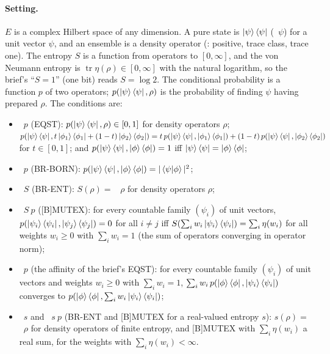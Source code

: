 \documentclass[11pt]{article}
\begin{document}
\paragraph{Setting.} $E$ is a complex Hilbert space of any dimension. A pure state is
$\ket\psi\bra\psi$ (~$\psi$) for a unit vector $\psi$, and an ensemble is a density
operator (: positive, trace class, trace one). The entropy
$S$ is a function from operators to $[0, \infty]$, and the von Neumann entropy
 is $\operatorname{tr}\eta(\rho) \in [0, \infty]$ with the natural
logarithm, so the brief's ``$S = 1$'' (one bit) reads $S = \log 2$. The conditional probability
is a function $p$ of two operators; $p(\ket\psi\bra\psi, \rho)$ is the probability of finding
$\psi$ having prepared $\rho$. The conditions are:
\begin{itemize}
\item {}~$p$ (EQST): $p(\ket\psi\bra\psi, \rho) \in [0, 1]$ for density
  operators $\rho$; $p(\ket\psi\bra\psi, t\ket{\phi_1}\bra{\phi_1} +
  (1 - t)\ket{\phi_2}\bra{\phi_2}) = t\,p(\ket\psi\bra\psi, \ket{\phi_1}\bra{\phi_1}) +
  (1 - t)\,p(\ket\psi\bra\psi, \ket{\phi_2}\bra{\phi_2})$ for $t \in [0, 1]$; and
  $p(\ket\psi\bra\psi, \ket\phi\bra\phi) = 1$ iff $\ket\psi\bra\psi = \ket\phi\bra\phi$;
\item {}~$p$ (BR-BORN): $p(\ket\psi\bra\psi, \ket\phi\bra\phi) =
  |\braket{\psi|\phi}|^2$;
\item {}~$S$ (BR-ENT): $S(\rho) = $ ~$\rho$ for
  density operators $\rho$;
\item {}~$S\ p$ ([B]MUTEX): for every countable family $(\psi_i)$ of unit
  vectors, $p(\ket{\psi_i}\bra{\psi_i}, \ket{\psi_j}\bra{\psi_j}) = 0$ for all $i \ne j$ iff
  $S(\sum_i w_i\ket{\psi_i}\bra{\psi_i}) = \sum_i \eta(w_i)$ for all weights $w_i \ge 0$ with
  $\sum_i w_i = 1$ (the sum of operators converging in operator norm);
\item {}~$p$ (the affinity of the brief's EQST): for every countable family
  $(\psi_i)$ of unit vectors and weights $w_i \ge 0$ with $\sum_i w_i = 1$,
  $\sum_i w_i\,p(\ket\phi\bra\phi, \ket{\psi_i}\bra{\psi_i})$ converges to
  $p(\ket\phi\bra\phi, \sum_i w_i\ket{\psi_i}\bra{\psi_i})$;
\item {}~$s$ and ~$s\ p$ (BR-ENT
  and [B]MUTEX for a real-valued entropy $s$): $s(\rho) = $ ~$\rho$ for
  density operators of finite entropy, and [B]MUTEX with $\sum_i \eta(w_i)$ a real sum, for the
  weights with $\sum_i \eta(w_i) < \infty$.
\end{itemize}
\end{document}
